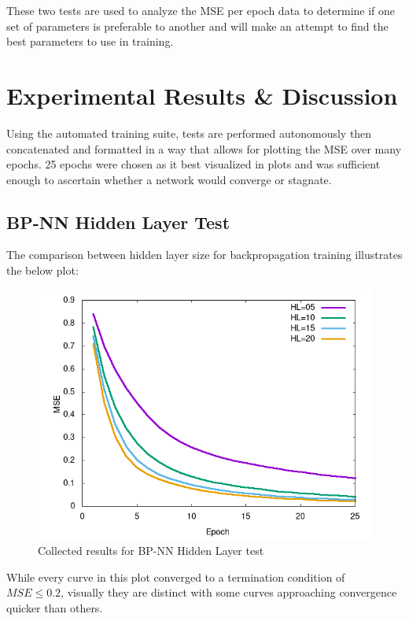 \documentclass[a4paper,12pt]{article}
\begin{document}
These two tests are used to analyze the MSE per epoch data to determine if one set of parameters is preferable to another and will make an attempt to find the best parameters to use in training.

\section{Experimental Results \& Discussion}

Using the automated training suite, tests are performed autonomously then concatenated and formatted in a way that allows for plotting the MSE over many epochs. 25 epochs were chosen as it best visualized in plots and was sufficient enough to ascertain whether a network would converge or stagnate.

\subsection{BP-NN Hidden Layer Test}

The comparison between hidden layer size for backpropagation training illustrates the below plot:

\begin{figure}[h!]
\centering
\includegraphics[scale=0.60]{images/bp-hl-plot.png}
\caption{Collected results for BP-NN Hidden Layer test}
\label{fig:bp-nn-hl}
\end{figure}

While every curve in this plot converged to a termination condition of $MSE \leq 0.2$, visually they are distinct with some curves approaching convergence quicker than others.
\end{document}
